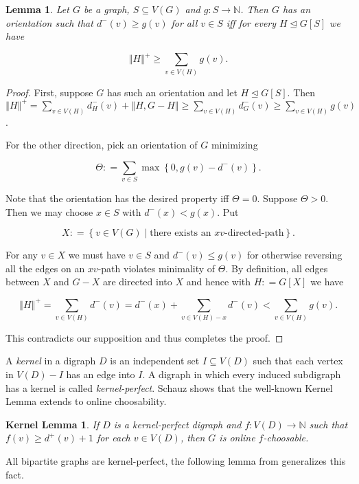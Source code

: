 \documentclass[12pt]{article}
\theoremstyle{plain}
\newtheorem{lem}[thm]{Lemma}
\newtheorem*{KernelLemma}{Kernel Lemma}
\theoremstyle{definition}
\theoremstyle{remark}
\newcommand{\IN}{\mathbb{N}}
\newcommand{\set}[1]{\left\{ #1 \right\}}
\newcommand{\setb}[3]{\left\{ #1 \in #2 \mid #3 \right\}}
\newcommand{\size}[1]{\left\Vert#1\right\Vert}
\newcommand{\func}[3]{#1\colon #2 \rightarrow #3}
\newcommand{\DefinedAs}{\mathrel{\mathop:}=}
\begin{document}
\begin{lem}\label{InOrientations}
Let $G$ be a graph, $S \subseteq V(G)$ and $\func{g}{S}{\IN}$.  Then $G$ has an orientation such that $d^-(v) \geq g(v)$ for all $v \in S$ iff for every $H \unlhd G[S]$ we have

\[\size{H}^+ \geq \sum_{v \in V(H)} g(v).\]
\end{lem}
\begin{proof}
First, suppose $G$ has such an orientation and let $H \unlhd G[S]$.  Then $\size{H}^+ = \sum_{v \in V(H)} d_H^-(v) + \size{H, G-H} \geq \sum_{v \in V(H)} d_G^-(v) \geq \sum_{v \in V(H)} g(v)$.

For the other direction, pick an orientation of $G$ minimizing

\[\Theta \DefinedAs \sum_{v \in S} \max\set{0, g(v) - d^-(v)}.\]

\noindent Note that the orientation has the desired property iff $\Theta = 0$. Suppose $\Theta > 0$.  Then we may choose $x \in S$ with $d^-(x) < g(x)$. Put

\[X \DefinedAs \setb{v}{V(G)}{\text{there exists an $xv$-directed-path}}.\]

\noindent For any $v \in X$ we must have $v \in S$ and $d^-(v) \leq g(v)$ for otherwise reversing all the edges on an $xv$-path violates minimality of $\Theta$.  By definition, all edges between $X$ and $G-X$ are directed into $X$ and hence with $H \DefinedAs G[X]$ we have

\[\size{H}^+ = \sum_{v \in V(H)} d^-(v) = d^-(x) + \sum_{v \in V(H) - x} d^-(v) < \sum_{v \in V(H)} g(v).\]

\noindent This contradicts our supposition and thus completes the proof.
\end{proof}

A \emph{kernel} in a digraph $D$ is an independent set $I \subseteq V(D)$ such that each vertex in $V(D) - I$ has an edge into $I$.  A digraph in which every induced subdigraph has a kernel is called \emph{kernel-perfect}.  Schauz \cite{schauz2009mr} shows that the well-known Kernel Lemma extends to online choosability.

\begin{KernelLemma}
If $D$ is a kernel-perfect digraph and $\func{f}{V(D)}{\IN}$ such that $f(v) \geq d^+(v) + 1$ for each $v \in V(D)$, then $G$ is online $f$-choosable.
\end{KernelLemma}

All bipartite graphs are kernel-perfect, the following lemma from \cite{kostochkayancey2012ore} generalizes this fact.
\end{document}
